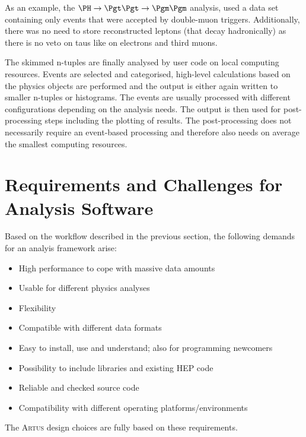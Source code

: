 \documentclass[3p]{elsarticle}
\newcommand{\software}[1]{\textsc{#1}\xspace}
\newcommand{\artus}{\software{Artus}}
\begin{document}
As an example, the $\PH\to\Pgt\Pgt\to\Pgm\Pgm$ analysis, used a data set containing only events that were accepted by double-muon triggers. Additionally, there was no need to store reconstructed \Pgt leptons (that decay hadronically) as there is no veto on taus like on electrons and third muons.

The skimmed n-tuples are finally analysed by user code on local computing resources. Events are selected and categorised, high-level calculations based on the physics objects are performed and the output is either again written to smaller n-tuples or histograms. The events are usually processed with different configurations depending on the analysis needs. The output is then used for post-processing steps including the plotting of results. The post-processing does not necessarily require an event-based processing and therefore also needs on average the smallest computing resources.



\section{Requirements and Challenges for Analysis Software\label{section_artus_challenges}}
Based on the workflow described in the previous section, the following demands for an analyis framework arise:
\begin{itemize}
 \item High performance to cope with massive data amounts %
 \item Usable for different physics analyses %
 \item Flexibility %
 \item Compatible with different data formats %
 \item Easy to install, use and understand; also for programming newcomers %
 \item Possibility to include libraries and existing HEP code %
 \item Reliable and checked source code %
 \item Compatibility with different operating platforms/environments %
\end{itemize}
The \artus design choices are fully based on these requirements.
\end{document}
